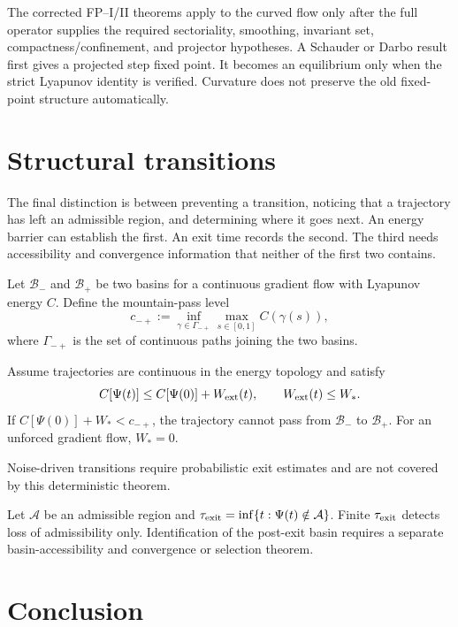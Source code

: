 \documentclass[11pt]{article}
\begin{document}
The corrected FP--I/II theorems apply to the curved flow only after the full
operator supplies the required sectoriality, smoothing, invariant set,
compactness/confinement, and projector hypotheses. A Schauder or Darbo result
first gives a projected step fixed point. It becomes an equilibrium only when
the strict Lyapunov identity is verified. Curvature does not preserve the old
fixed-point structure automatically.

\section{Structural transitions}

The final distinction is between preventing a transition, noticing that a
trajectory has left an admissible region, and determining where it goes next.
An energy barrier can establish the first.  An exit time records the second.
The third needs accessibility and convergence information that neither of the
first two contains.

Let $\mathcal B_-$ and $\mathcal B_+$ be two basins for a continuous gradient
flow with Lyapunov energy $C$. Define the mountain-pass level
\[
c_{-+}:=\inf_{\gamma\in\Gamma_{-+}}\max_{s\in[0,1]}C(\gamma(s)),
\]
where $\Gamma_{-+}$ is the set of continuous paths joining the two basins.

\begin{theorem}\label{thm:barrier}
Assume trajectories are continuous in the energy topology and satisfy
\[
C[\Psi(t)]\le C[\Psi(0)]+W_{\rm ext}(t),
\qquad W_{\rm ext}(t)\le W_\ast.
\]
If $C[\Psi(0)]+W_\ast<c_{-+}$, the trajectory cannot pass from
$\mathcal B_-$ to $\mathcal B_+$. For an unforced gradient flow,
$W_\ast=0$.
\end{theorem}

Noise-driven transitions require probabilistic exit estimates and are not
covered by this deterministic theorem.

\begin{theorem}\label{thm:exit}
Let $\mathcal A$ be an admissible region and
$\tau_{\rm exit}=\inf\{t:\Psi(t)\notin\mathcal A\}$. Finite
$\tau_{\rm exit}$ detects loss of admissibility only. Identification of the
post-exit basin requires a separate basin-accessibility and convergence or
selection theorem.
\end{theorem}

\section{Conclusion}
\end{document}
